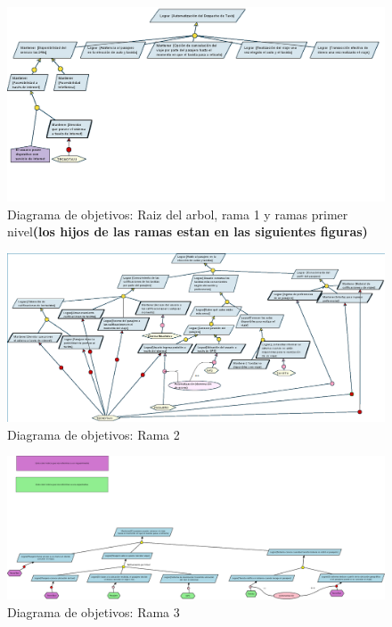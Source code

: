 \begin{figure}[h!]
  \centering        
    \includegraphics[scale=0.60]{diagramas/objetivos/objetivosrama1-main.png}
  \caption{Diagrama de objetivos: Raiz del arbol, rama 1 y ramas primer nivel\textbf{(los hijos de las ramas estan en las siguientes figuras)}}
\end{figure}

\begin{figure}[h!]
  \centering        
    \includegraphics[scale=0.45]{diagramas/objetivos/objetivosrama2.png}
  \caption{Diagrama de objetivos: Rama 2}
\end{figure}

\begin{figure}[h!]
  \centering        
    \includegraphics[scale=0.20]{diagramas/objetivos/objetivosrama3.png}
  \caption{Diagrama de objetivos: Rama 3}
\end{figure}

